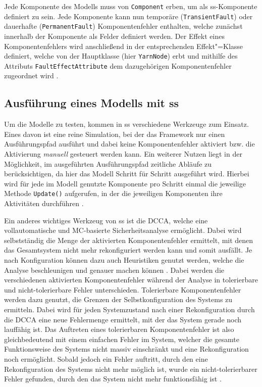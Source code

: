 Jede Komponente des Modells muss von \texttt{Component} erben, um als \ac{ss}-Komponente definiert zu sein.
Jede Komponente kann nun temporäre (\texttt{TransientFault}) oder dauerhafte (\texttt{PermanentFault}) Komponentenfehler enthalten, welche zunächst innerhalb der Komponente als Felder definiert werden. 
Der Effekt eines Komponentenfehlers wird anschließend in der entsprechenden Effekt"=Klasse definiert, welche von der Hauptklasse (hier \texttt{YarnNode}) erbt und mithilfe des Attributs \texttt{FaultEffectAttribute} dem dazugehörigen Komponentenfehler zugeordnet wird \cite{Habermaier2016}.

\subsection{Ausführung eines Modells mit \acs{ss}}
\label{subsec:ssharpExecution}

Um die Modelle zu testen, kommen in \ac{ss} verschiedene Werkzeuge zum Einsatz.
Eines davon ist eine reine Simulation, bei der das Framework nur einen Ausführungspfad ausführt und dabei keine Komponentenfehler aktiviert bzw. die Aktivierung \textit{manuell} gesteuert werden kann.
Ein weiterer Nutzen liegt in der Möglichkeit, im ausgeführten Ausführungspfad zeitliche Abläufe zu berücksichtigen, da hier das Modell Schritt für Schritt ausgeführt wird.
Hierbei wird für jede im Modell genutzte Komponente pro Schritt einmal die jeweilige Methode \texttt{Update()} aufgerufen, in der die jeweiligen Komponenten ihre Aktivitäten durchführen \cite{Habermaier2016}.

Ein anderes wichtiges Werkzeug von \ac{ss} ist die \ac{DCCA}, welche eine vollautomatische und \ac{MC}-basierte Sicherheitsanalyse ermöglicht.
Dabei wird selbstständig die Menge der aktivierten Komponentenfehler ermittelt, mit denen das Gesamtsystem nicht mehr rekonfiguriert werden kann und somit ausfällt.
Je nach Konfiguration können dazu auch Heuristiken genutzt werden, welche die Analyse beschleunigen und genauer machen können \cite{Eberhardinger2016}.
Dabei werden die verschiedenen aktivierten Komponentenfehler während der Analyse in tolerierbare und nicht-tolerierbare Fehler unterschieden.
Tolerierbare Komponentenfehler werden dazu genutzt, die Grenzen der Selbstkonfiguration des Systems zu ermitteln.
Dabei wird für jeden Systemzustand nach einer Rekonfiguration durch die \ac{DCCA} eine neue Fehlermenge ermittelt, mit der das System gerade noch lauffähig ist.
Das Auftreten eines tolerierbaren Komponentenfehler ist also gleichbedeutend mit einem einfachen Fehler im System, welcher die gesamte Funktionsweise des Systems nicht massiv einschränkt und eine Rekonfiguration noch ermöglicht.
Sobald jedoch ein Fehler auftritt, durch den eine Rekonfiguration des Systems nicht mehr möglich ist, wurde ein nicht-tolerierbarer Fehler gefunden, durch den das System nicht mehr funktionsfähig ist \cite{Habermaier2015}.

